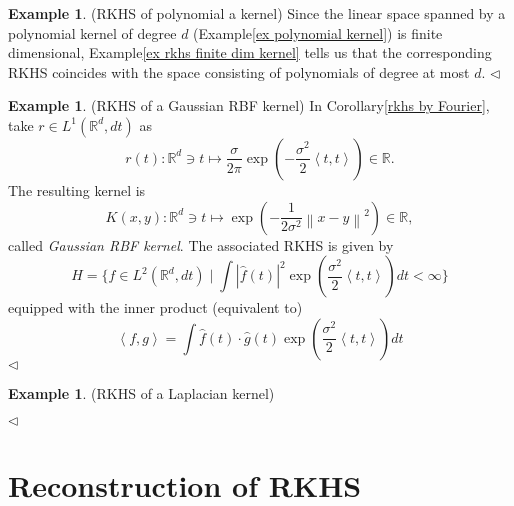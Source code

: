 \documentclass[a4paper,12pt]{article}
\theoremstyle{remark}
\theoremstyle{definition}
\theoremstyle{definition}
\newtheorem{ex}[thm]{Example}
\theoremstyle{definition}
\newcommand{\ip}[2]{\left<#1, #2 \right>}
\newcommand{\norm}[1]{\left\| #1 \right\|}
\newcommand{\fin}{\hfill \( \triangleleft \) }
\begin{document}
\begin{ex} (RKHS of polynomial a kernel)
	Since the linear space spanned by a polynomial kernel of degree \( d \) (Example\ref{ex polynomial kernel}) is finite dimensional, Example\ref{ex rkhs finite dim kernel} tells us that the corresponding RKHS coincides with the space consisting of polynomials of degree at most \( d \).
	\fin\end{ex}

\begin{ex} (RKHS of a Gaussian RBF kernel)
	In Corollary\ref{rkhs by Fourier}, take \( r \in L^{1}(\mathbb{R}^d, dt) \) as
	\[
		r(t) :\mathbb{R} ^d \ni t \mapsto \frac{\sigma}{2 \pi} \exp \left( - \frac{\sigma^2}{2} \ip{t}{t} \right) \in \mathbb{R}.
	\]
	The resulting kernel is
	\[
		K(x,y) : \mathbb{R} ^d \ni t \mapsto \exp \left( -\frac{1}{2 \sigma^2} \norm{x-y}^2 \right) \in \mathbb{R},
	\]
	called \textit{Gaussian RBF kernel}. The associated RKHS is given by
	\[
		H = \{f \in L^2(\mathbb{R}^d, dt) \mid \int |\hat{f}(t)|^2 \exp \left( \frac{\sigma^2}{2} \ip{t}{t} \right) dt < \infty \}
	\]
	equipped with the inner product (equivalent to)
	\[
		\ip{f}{g} = \int \hat{f}(t)\cdot \hat{g}(t) \exp \left( \frac{\sigma^2}{2} \ip{t}{t} \right) dt
	\]
	\fin\end{ex}

\begin{ex} (RKHS of a Laplacian kernel)

	\fin\end{ex}

\section{Reconstruction of RKHS}
\end{document}
